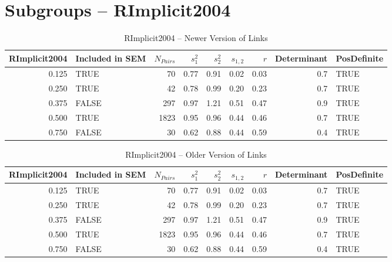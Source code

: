 \documentclass{article}\usepackage{graphicx, color}
\begin{document}
\section{Subgroups --  RImplicit2004 }%
\begin{table}[ht]
\begin{center}
\begin{tabular}{rlrrrrrrl}
  \hline
RImplicit2004 & Included in SEM & $N_{Pairs}$ & $s_1^2$ & $s_2^2$ & $s_{1,2}$ & $r$ & Determinant & PosDefinite \\ 
  \hline
0.125 & TRUE & 70 & 0.77 & 0.91 & 0.02 & 0.03 & 0.7 & TRUE \\ 
  0.250 & TRUE & 42 & 0.78 & 0.99 & 0.20 & 0.23 & 0.7 & TRUE \\ 
  0.375 & FALSE & 297 & 0.97 & 1.21 & 0.51 & 0.47 & 0.9 & TRUE \\ 
  0.500 & TRUE & 1823 & 0.95 & 0.96 & 0.44 & 0.46 & 0.7 & TRUE \\ 
  0.750 & FALSE & 30 & 0.62 & 0.88 & 0.44 & 0.59 & 0.4 & TRUE \\ 
   \hline
\end{tabular}
\caption{RImplicit2004 -- Newer Version of Links}
\end{center}
\end{table}
\begin{table}[ht]
\begin{center}
\begin{tabular}{rlrrrrrrl}
  \hline
RImplicit2004 & Included in SEM & $N_{Pairs}$ & $s_1^2$ & $s_2^2$ & $s_{1,2}$ & $r$ & Determinant & PosDefinite \\ 
  \hline
0.125 & TRUE & 70 & 0.77 & 0.91 & 0.02 & 0.03 & 0.7 & TRUE \\ 
  0.250 & TRUE & 42 & 0.78 & 0.99 & 0.20 & 0.23 & 0.7 & TRUE \\ 
  0.375 & FALSE & 297 & 0.97 & 1.21 & 0.51 & 0.47 & 0.9 & TRUE \\ 
  0.500 & TRUE & 1823 & 0.95 & 0.96 & 0.44 & 0.46 & 0.7 & TRUE \\ 
  0.750 & FALSE & 30 & 0.62 & 0.88 & 0.44 & 0.59 & 0.4 & TRUE \\ 
   \hline
\end{tabular}
\caption{RImplicit2004 -- Older Version of Links}
\end{center}
\end{table}
\end{document}

